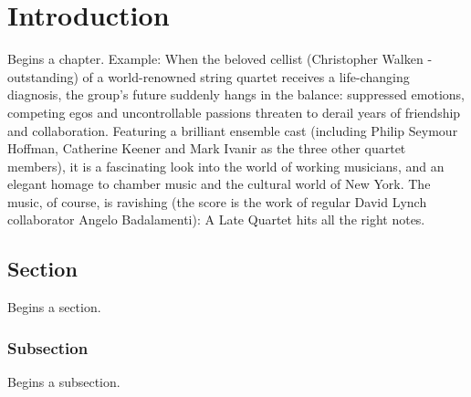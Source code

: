 %
%
\chapter{Introduction}
\label{chap:intro}

Begins a chapter. Example: When the beloved cellist (Christopher Walken - outstanding) of a world-renowned string quartet receives a life-changing diagnosis, the group's future suddenly hangs in the balance: suppressed emotions, competing egos and uncontrollable passions threaten to derail years of friendship and collaboration. Featuring a brilliant ensemble cast (including Philip Seymour Hoffman, Catherine Keener and Mark Ivanir as the three other quartet members), it is a fascinating look into the world of working musicians, and an elegant homage to chamber music and the cultural world of New York. The music, of course, is ravishing (the score is the work of regular David Lynch collaborator Angelo Badalamenti): A Late Quartet hits all the right notes.

\section{Section}
\label{sec:sec01}

Begins a section.

\subsection{Subsection}
\label{subsec:subsec01}

Begins a subsection.


